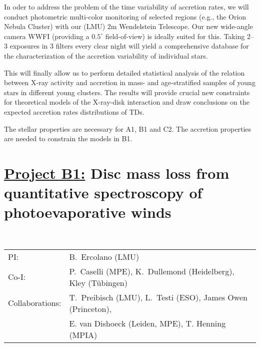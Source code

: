 In oder to address the problem of the time variability of accretion rates,
we will conduct photometric multi-color monitoring of selected regions
(e.g., the Orion Nebula Cluster)
with our (LMU) 2m Wendelstein Telescope. 
Our new wide-angle camera WWFI (providing a $0.5^\circ$ field-of-view) is ideally suited
for this. Taking 2--3 exposures in 3 filters
every clear night will yield a comprehensive database for the characterization
of the accretion variability of individual stars.



This will finally allow us to perform
 detailed statistical analysis
of the relation between X-ray activity and accretion in mass- and age-stratified
samples of young stars in different young clusters. The results will
provide crucial new
constraints for theoretical models of the X-ray-disk interaction and
draw conclusions on the expected accretion rates distributions of TDs.



\vspace{0.5em}
The stellar properties are necessary for A1, B1 and C2. The accretion properties are needed to constrain the models in B1. 




\def\remove#1{}




\pagebreak[4]

\section*{\underline{Project B1:} 
Disc mass loss from quantitative spectroscopy
of photoevaporative winds}

\\
\begin{tabular}{ll}
{\textsf{PI:}}                  & B.~Ercolano (LMU)\\
{\textsf{Co-I:}}                &P.~Caselli (MPE), K.~Dullemond (Heidelberg), Kley (T\"ubingen)\\
{\textsf{Collaborations:}}      & T.~Preibisch (LMU), L.~Testi (ESO), James Owen (Princeton), \\
& E. van Dishoeck (Leiden, MPE), T. Henning (MPIA)  \\
\end{tabular}

